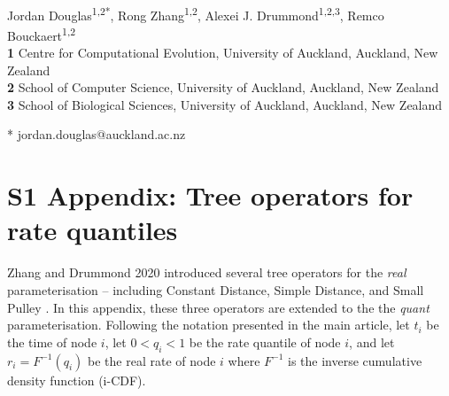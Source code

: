 \documentclass[12pt]{article}
\begin{document}
\vspace*{0.2in}

\begin{flushleft}
{\Large
\textbf{} %
}
\newline
\\
Jordan Douglas\textsuperscript{1,2*},
Rong Zhang\textsuperscript{1,2},
Alexei J. Drummond\textsuperscript{1,2,3},
Remco Bouckaert\textsuperscript{1,2}
\\
\bigskip
\textbf{1} Centre for Computational Evolution,  University of Auckland, Auckland, New Zealand\\
\textbf{2} School of Computer Science, University of Auckland, Auckland, New Zealand\\
\textbf{3} School of Biological Sciences, University of Auckland, Auckland, New Zealand
\\
\bigskip


* jordan.douglas@auckland.ac.nz


\end{flushleft}




\section*{S1 Appendix: Tree operators for rate quantiles}




Zhang and Drummond 2020 introduced several tree operators for the \textit{real} parameterisation -- including Constant Distance, Simple Distance, and Small Pulley \cite{zhang2020improving}.
In this appendix, these three operators are extended to the  the \textit{quant} parameterisation.
Following the notation presented in the main article, let $t_i$ be the time of node $i$, let $0 < q_i < 1$ be the rate quantile of node $i$, and let $r_i = F^{-1}(q_i)$ be the real rate of node $i$ where $F^{-1}$ is the inverse cumulative density function (i-CDF).
\end{document}
